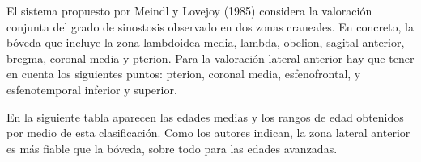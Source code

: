\documentclass[a4paper,11pt]{article}
\begin{document}
El sistema propuesto por Meindl y Lovejoy (1985) considera la valoración conjunta del grado de sinostosis observado en dos zonas craneales. En concreto, la bóveda que incluye la zona lambdoidea media, lambda, obelion, sagital anterior, bregma, coronal media y pterion.
\newpage
Para la valoración lateral anterior hay que tener en cuenta los siguientes puntos: pterion, coronal media, esfenofrontal, y esfenotemporal inferior y superior.

En la siguiente tabla aparecen las edades medias y los rangos de edad obtenidos por medio de esta clasificación. Como los autores indican, la zona lateral anterior es más fiable que la bóveda, sobre todo para las edades avanzadas.
\begin{center}
\end{center}
\end{document}
